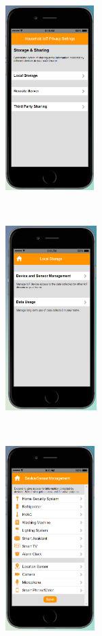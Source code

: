 \begin{figure}
	\centering
	\begin{subfigure}[t]{0.2\textwidth}
		\centering
		\includegraphics[height=2.8in]{figures/ui2allOff1.png}
	\end{subfigure}%
	~~~~~
	\begin{subfigure}[t]{0.2\textwidth}
		\centering
		\includegraphics[height=2.8in]{figures/ui2allOffLocal.png}
	\end{subfigure}%
	~~~~~
	\begin{subfigure}[t]{0.2\textwidth}
		\centering
		\includegraphics[height=2.8in]{figures/ui2allOff2.png}

\end{subfigure}
\end{figure}
